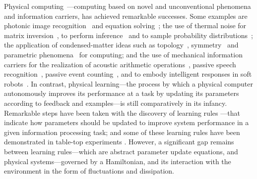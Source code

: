 Physical computing~\cite{jaeger2023toward}---computing based on novel and unconventional phenomena and information carriers, has achieved remarkable successes. Some examples are photonic image recognition~\cite{photonicImageRecognition, mcmahonReviewOptical} and equation solving~\cite{metasurfaceComputingPolman, metamaterialDifferentialEquation}; the use of thermal noise for matrix inversion~\cite{thermodynamicMatrixInversion}, to perform inference~\cite{thermodynamicBayesianInference} and to sample probability distributions~\cite{ logarithmicBayesianQuerlioz}; the application of condensed-matter ideas such as topology~\cite{computingWithTopology}, symmetry~\cite{learningWithSymmetry} and parametric phenomena~\cite{computingParametricEffects} for computing; and the use of mechanical information carriers for the realization of acoustic arithmetic operations~\cite{fleuryMetamaterials}, passive speech recognition~\cite{dubvcek2024sensor}, passive event counting~\cite{beamCounting}, and to embody intelligent responses in soft robots~\cite{roboticOctopusEmbodiedIntelligence}. In contrast, physical learning---the process by which a physical computer autonomously improves its performance at a task by updating its parameters according to feedback and examples---is still comparatively in its infancy. Remarkable steps have been taken with the discovery of learning rules \cite{PhysicalLearningReview, EP1, EP2, CLflow, HEB, Hebbian, anisetti2024frequency, anisetti2023learning}---that indicate how parameters should be updated to improve system performance in a given information processing task; and some of these learning rules have been demonstrated in table-top experiments \cite{labDem, labDem2, arinze2023learning}. However, a significant gap remains between learning rules---which are abstract parameter update equations, and physical systems---governed by a Hamiltonian, and its interaction with the environment in the form of fluctuations and dissipation. %